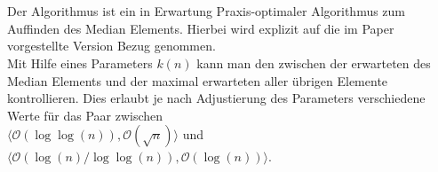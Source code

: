\section{\RM}	%

Der Algorithmus \RM ist ein in Erwartung Praxis-optimaler Algorithmus zum Auffinden des Median Elements. Hierbei wird explizit auf die im Paper~\cite{meyer2} vorgestellte Version Bezug genommen.\\[.1cm]
Mit Hilfe eines Parameters $k(n)$ kann man den \trade zwischen der erwarteten \fg \fgM des Median Elements und der maximal erwarteten \fg \fgr aller übrigen Elemente kontrollieren. Dies erlaubt je nach Adjustierung des Parameters verschiedene Werte für das Paar \fgpair zwischen\\
$\langle\mathcal{O}(\log\log(n)),\mathcal{O}(\sqrt{n})\rangle$ und $\langle\mathcal{O}(\log(n)/\log\log(n)),\mathcal{O}(\log(n))\rangle$.

